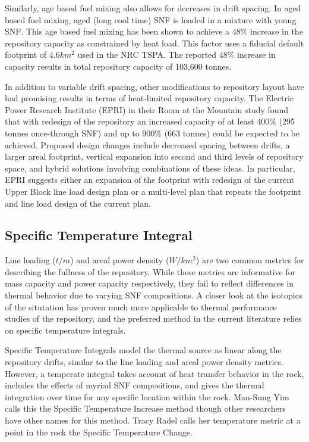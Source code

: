Similarly, age based fuel mixing also allows for decreases in drift spacing. In
aged based fuel mixing, aged (long cool time) SNF is loaded in a mixture with
young SNF. This age based fuel mixing has been shown to achieve a $48\%$
increase in the repository capacity as constrained by heat
load.\cite{nicholson_thermal_2007} This factor uses a fiducial default
footprint of $4.6 km^2$ used in the NRC TSPA.  The reported $48\%$ increase in
capacity results in total repository capacity of 103,600
tonnes.\cite{williams_contract_2001}

In addition to variable drift spacing, other modifications to repository layout
have had promising results in terms of heat-limited repository capacity. The
Electric Power Research Institute (EPRI) in their Room at the Mountain study
found that with redesign of the repository an increased capacity of at least
$400\%$ (295 tonnes once-through SNF) and up to $900\%$ (663 tonnes) could be
expected to be achieved. Proposed design changes include decreased spacing
between drifts, a larger areal footprint, vertical expansion into second and
third levels of repository space, and hybrid solutions involving combinations
of these ideas. In particular, EPRI suggests either an expansion of the
footprint with redesign of the current Upper Block line load design plan or a
multi-level plan that repeats the footprint and line load design of the current
plan.\cite{kessler_room_2006}

 


\subsection{Specific Temperature Integral}

Line loading ($t/m$) and areal power density ($W/km^2$) are two common metrics
for describing the fullness of the repository. While these metrics are
informative for mass capacity and power capacity respectively, they fail to
reflect differences in thermal behavior due to varying SNF compositions.  A
closer look at the isotopics of the situtation has proven much more applicable
to thermal performance studies of the repository, and the preferred method in
the current literature relies on specific temperature integrals.


Specific Temperature Integrals model the thermal source as linear along the
repository drifts, similar to the line loading and areal power density metrics.
However, a temperate integral takes account of heat transfer behavior in the
rock, includes the effects of myriad SNF compositions, and gives the thermal
integration over time for any specific location within the rock.  Man-Sung Yim
calls this the Specific Temperature Increase method\cite{li_specific_2008}
though other researchers have other names for this method. Tracy Radel calls
her temperature metric at a point in the rock the Specific Temperature
Change.\cite{radel_repository_2007}

